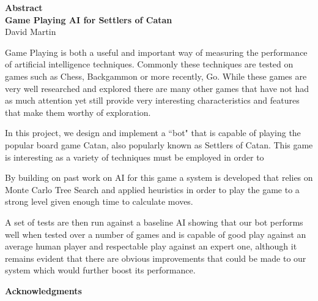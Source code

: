 \documentclass[]{article}
\newcommand\blankpage{%
    \null
    \thispagestyle{empty}%
    \addtocounter{page}{-1}%
    \newpage}
\newenvironment{changemargin}[2]{%
\begin{list}{}{%
\setlength{\topsep}{0pt}%
\setlength{\leftmargin}{#1}%
\setlength{\rightmargin}{#2}%
\setlength{\listparindent}{\parindent}%
\setlength{\itemindent}{\parindent}%
\setlength{\parsep}{\parskip}%
}%
\item[]}{\end{list}}
\begin{document}
\blankpage

\thispagestyle{plain}
\begin{center}
    \huge
    \textbf{Abstract}
    \\
    \large
    \vspace{1.0cm}
    \textbf{Game Playing AI for Settlers of Catan}   
    \vspace{0.2cm}
    \\
    David Martin
    \vspace{0.1cm}
    \\ 
    \noindent\makebox[\linewidth]{\rule{\textwidth}{1pt}} 
\end{center}


\begin{changemargin}{1.8cm}{1.8cm}
 Game Playing is both a useful and important way of measuring the performance of artificial intelligence techniques. Commonly these techniques are tested on games such as Chess, Backgammon or more recently, Go. While these games are very well researched and explored there are many other games that have not had as much attention yet still provide very interesting characteristics and 
 features that make them worthy of exploration.
 
 In this project, we design and implement a ``bot" that is capable of playing the popular board game Catan, also popularly known as Settlers of Catan. This game is interesting as a variety of techniques must be employed in order to 
 
 By building on past work on AI for this game a system is developed that relies on Monte Carlo Tree Search and applied heuristics in order to play the game to a strong level given enough time to calculate moves.
 
 A set of tests are then run against a baseline AI showing that our bot performs well when tested over a number of games and is capable of good play against an average human player and respectable play against an expert one, although it remains evident that there are obvious improvements that could be made to our system which would further boost its performance.
\end{changemargin}


\pagebreak

\thispagestyle{plain}
\begin{center}
    \huge
    \textbf{Acknowledgments}
    \\
    \large
    \vspace{0.5cm}
    \noindent\makebox[\linewidth]{\rule{\textwidth}{1pt}} 
\end{center}
\end{document}
